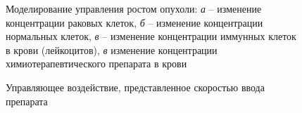 \begin{figure}[ht!]
\begin{minipage}[h]{0.49\linewidth}
	\end{minipage}
	\hfill
	\begin{minipage}[h]{0.49\linewidth}
	\end{minipage}
	\caption{Моделирование управления ростом опухоли: \textit{а} -- изменение концентрации раковых клеток, \textit{б} -- изменение концентрации нормальных клеток, \textit{в} -- изменение концентрации иммунных клеток в крови (лейкоцитов), \textit{в} изменение концентрации химиотерапевтического препарата в крови}
	\label{fig:tumor-ch3}
\end{figure}
\begin{figure}[ht!]
	\caption{Управляющее воздействие, представленное скоростью ввода препарата }
	\label{fig:u-ch3}
\end{figure}


